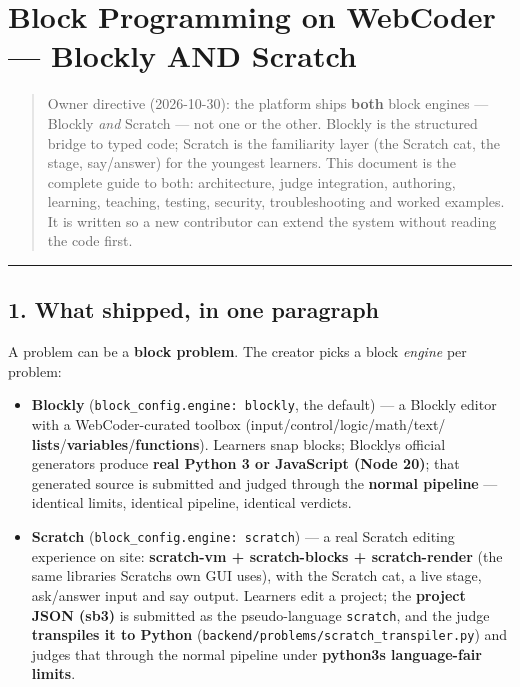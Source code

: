 \documentclass[
]{article}
\author{}
\date{}
\providecommand{\tightlist}{%
  \setlength{\itemsep}{0pt}\setlength{\parskip}{0pt}}
\begin{document}
{
\setcounter{tocdepth}{2}
\tableofcontents
}
\section{Block Programming on WebCoder --- Blockly AND
Scratch}\label{block-programming-on-webcoder--blockly-and-scratch}

\begin{quote}
Owner directive (2026-10-30): the platform ships \textbf{both} block
engines --- Blockly \emph{and} Scratch --- not one or the other. Blockly
is the structured bridge to typed code; Scratch is the familiarity layer
(the Scratch cat, the stage, say/answer) for the youngest learners. This
document is the complete guide to both: architecture, judge integration,
authoring, learning, teaching, testing, security, troubleshooting and
worked examples. It is written so a new contributor can extend the
system without reading the code first.
\end{quote}

\begin{center}\rule{0.5\linewidth}{0.5pt}\end{center}

\subsection{1. What shipped, in one
paragraph}\label{1-what-shipped-in-one-paragraph}

A problem can be a \textbf{block problem}. The creator picks a block
\emph{engine} per problem:

\begin{itemize}
\tightlist
\item
  \textbf{Blockly}
  (\texttt{block\_config.engine:\ \textquotesingle{}blockly\textquotesingle{}},
  the default) --- a Blockly editor with a WebCoder-curated toolbox
  (input/control/logic/math/text/
  \textbf{lists}/\textbf{variables}/\textbf{functions}). Learners snap
  blocks; Blockly\textquotesingle s official generators produce
  \textbf{real Python 3 or JavaScript (Node 20)}; that generated source
  is submitted and judged through the \textbf{normal pipeline} ---
  identical limits, identical pipeline, identical verdicts.
\item
  \textbf{Scratch}
  (\texttt{block\_config.engine:\ \textquotesingle{}scratch\textquotesingle{}})
  --- a real Scratch editing experience on site: \textbf{scratch-vm +
  scratch-blocks + scratch-render} (the same libraries
  Scratch\textquotesingle s own GUI uses), with the Scratch cat, a live
  stage, ask/answer input and say output. Learners edit a project; the
  \textbf{project JSON (sb3)} is submitted as the pseudo-language
  \texttt{scratch}, and the judge \textbf{transpiles it to Python}
  (\texttt{backend/problems/scratch\_transpiler.py}) and judges that
  through the normal pipeline under \textbf{python3\textquotesingle s
  language-fair limits}.
\end{itemize}
\end{document}
